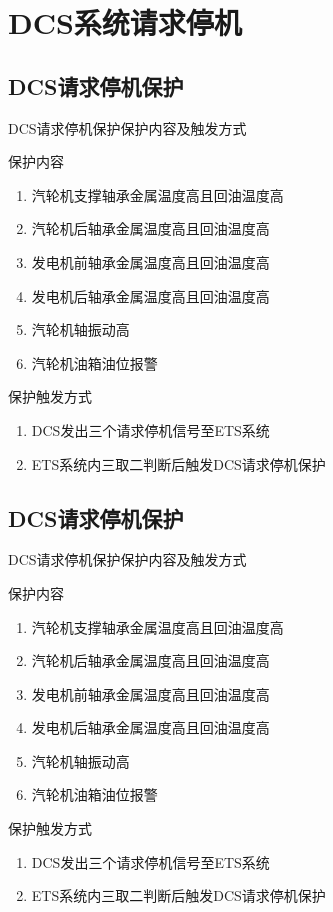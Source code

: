 \documentclass[12pt,hyperref={CJKbookmarks=true}]{beamer} %
\begin{document}
\section{DCS系统请求停机}
\subsection{DCS请求停机保护}
\begin{frame}{DCS请求停机保护}{保护内容及触发方式}
  		\begin{block}{保护内容}
  		\begin{enumerate}
				\item 汽轮机支撑轴承金属温度高且回油温度高
				\item 汽轮机后轴承金属温度高且回油温度高
				\item 发电机前轴承金属温度高且回油温度高
				\item 发电机后轴承金属温度高且回油温度高
				\item 汽轮机轴振动高
				\item 汽轮机油箱油位报警
			\end{enumerate}
\end{block}
\begin{alertblock}{保护触发方式}
  		\begin{enumerate}
			\item DCS发出三个请求停机信号至ETS系统
			\item ETS系统内三取二判断后触发DCS请求停机保护	
			\end{enumerate}
\end{alertblock}
	\end{frame}
\subsection{DCS请求停机保护}
\begin{frame}{DCS请求停机保护}{保护内容及触发方式}
  		\begin{block}{保护内容}
  		\begin{enumerate}
				\item 汽轮机支撑轴承金属温度高且回油温度高
				\item 汽轮机后轴承金属温度高且回油温度高
				\item 发电机前轴承金属温度高且回油温度高
				\item 发电机后轴承金属温度高且回油温度高
				\item 汽轮机轴振动高
				\item 汽轮机油箱油位报警
			\end{enumerate}
\end{block}
\begin{alertblock}{保护触发方式}
  		\begin{enumerate}
			\item DCS发出三个请求停机信号至ETS系统
			\item ETS系统内三取二判断后触发DCS请求停机保护	
			\end{enumerate}
\end{alertblock}
	\end{frame}
\end{document}
